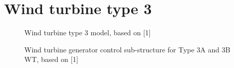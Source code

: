 \documentclass[
  a4paper,
  DIV=11,
  numbers=noendperiod]{scrartcl}
\begin{document}
\section{Wind turbine type 3}\label{wind-turbine-type-3}

\begin{figure}


\caption{\label{fig-wtSystem}Wind turbine type 3 model, based on
{[}1{]}}

\end{figure}%

\begin{figure}


\caption{\label{fig-wtControlSubstructure}Wind turbine generator control
sub-structure for Type 3A and 3B WT, based on {[}1{]}}

\end{figure}%
\end{document}
